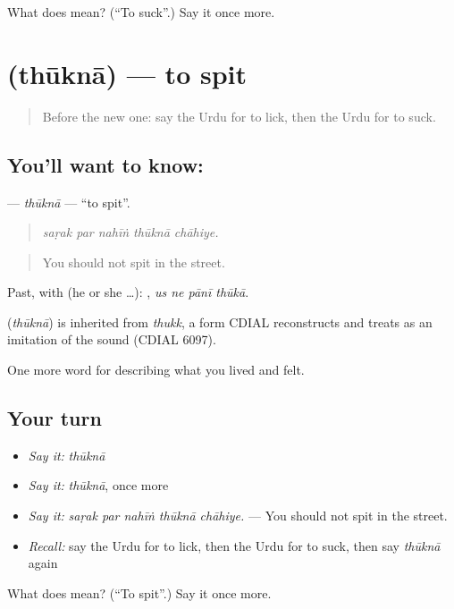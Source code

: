 \begin{tcolorbox}[breakable,colback=teal!4,colframe=teal!35!black,title={Before you move on}]
What does  mean? (\textquotedblleft{}To suck\textquotedblright{}.) Say it once more.
\end{tcolorbox}
\section[\texorpdfstring{\ur{تھوکنا} (thūknā)}{تھوکنا (thūknā)}]{ (thūknā) — to spit}

\label{lesson:UR-C467-thukna}



\begin{quote}
Before the new one: say the Urdu for to lick, then the Urdu for to suck.
\end{quote}

\subsection*{You'll want to know: }
\textbf{} — \emph{thūknā} — \textquotedblleft{}to spit\textquotedblright{}.

\begin{quote}
    
\end{quote}

\begin{quote}
\emph{saṛak par nahīṅ thūknā chāhiye.}
\end{quote}

\begin{quote}
You should not spit in the street.
\end{quote}

Past, with  (he or she …):    , \emph{us ne pānī thūkā}.

\begin{cousinweb}
\textbf{} (\emph{thūknā}) is inherited from \emph{thukk}, a form CDIAL reconstructs and treats as an imitation of the sound (CDIAL 6097).
\end{cousinweb}

\begin{grammarlens}[title={What you've built}]
One more word for describing what you lived and felt.
\end{grammarlens}

\subsection*{Your turn}
\begin{itemize}
\raggedright
  \item \emph{Say it:} \emph{thūknā}
  \item \emph{Say it:} \emph{thūknā}, once more
  \item \emph{Say it:} \emph{saṛak par nahīṅ thūknā chāhiye.} — You should not spit in the street.
  \item \emph{Recall:} say the Urdu for to lick, then the Urdu for to suck, then say \emph{thūknā} again
\end{itemize}

\begin{tcolorbox}[breakable,colback=teal!4,colframe=teal!35!black,title={Before you move on}]
What does  mean? (\textquotedblleft{}To spit\textquotedblright{}.) Say it once more.
\end{tcolorbox}
